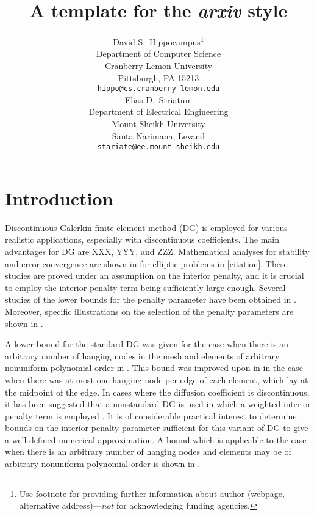 \documentclass{article}
\title{A template for the \emph{arxiv} style}
\author{
  David S.~Hippocampus\thanks{Use footnote for providing further
    information about author (webpage, alternative
    address)---\emph{not} for acknowledging funding agencies.} \\
  Department of Computer Science\\
  Cranberry-Lemon University\\
  Pittsburgh, PA 15213 \\
  \texttt{hippo@cs.cranberry-lemon.edu} \\
   \And
 Elias D.~Striatum \\
  Department of Electrical Engineering\\
  Mount-Sheikh University\\
  Santa Narimana, Levand \\
  \texttt{stariate@ee.mount-sheikh.edu} \\
}
\begin{document}
\maketitle

\begin{abstract}
\lipsum[1]
\end{abstract}




\section{Introduction}

Discontinuous Galerkin finite element method (DG) is employed for various realistic applications, especially with discontinuous coefficients. The main advantages for DG are XXX, YYY, and ZZZ. Mathematical analyses for stability and error convergence are shown in for elliptic problems in [citation]. 
These studies are proved under an assumption on the interior penalty, and it is   crucial to employ the interior penalty term being sufficiently large enough. 
Several studies of the lower bounds for the penalty parameter have been obtained in \cite{ainsworth2007posteriori,ainsworth2010fully,ainsworth2009constant,epshteyn2007estimation,shahbazi2005explicit}. Moreover, specific illustrations on the selection of the penalty parameters are shown in \cite{ainsworth2012note}.


A lower bound for the standard DG was given for the case when there is an arbitrary number of hanging nodes in the mesh and elements of arbitrary nonuniform polynomial order in \cite{shahbazi2005explicit}.
This bound was improved upon in \cite{ainsworth2009constant} in the case when there was at most one hanging node per edge of each element, which lay at the midpoint of the edge. 
In cases where the diffusion coefficient is discontinuous, it has been suggested that a nonstandard DG is used in which a weighted interior penalty term is employed \cite{ern2008posteriori,ern2009discontinuous}. 
It is of considerable practical interest to
determine bounds on the interior penalty parameter sufficient for this variant of DG to give
a well-defined numerical approximation. 
A bound which is
applicable to the case when there is an arbitrary number of hanging nodes and elements may be of arbitrary nonuniform polynomial order is shown in  \cite{ainsworth2012note}.
\end{document}
